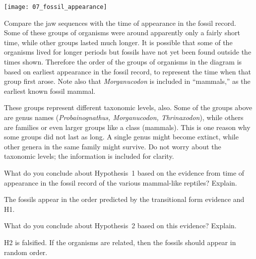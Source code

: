 \documentclass[12pt, hidelinks]{exam}
\newcommand*\AnswerBox[2]{%
    \parbox[t][#1]{0.92\textwidth}{%
    \begin{solution}#2\end{solution}}
    \vspace{\stretch{1}}
}
\begin{document}
\begin{questions}
\begin{center}
\texttt{[image: 07\_fossil\_appearance]}
\end{center}

Compare the jaw sequences with the time of appearance in the
fossil record. Some of these groups of organisms were around apparently
only a fairly short time, while other groups lasted much longer. It is possible
that some of the organisms lived for longer periods but fossils have not yet been
found outside the times shown. Therefore the order of the groups of organisms in the diagram is based on earliest
appearance in the fossil record, to represent the time when that
group first arose. Note also that \textit{Morganucodon} is included
in ``mammals,'' as the earliest known
fossil mammal.

These groups represent different taxonomic levels, also. Some of the
groups above are genus names (\emph{Probainognathus, Morganucodon,
Thrinaxodon}), while others are families or even larger groups like a class 
(mammals). This is one reason why some groups did not last as
long. A single genus might become extinct, while other genera in the
same family might survive. Do not worry about the taxonomic
levels; the information is included for clarity.

\question
What do you conclude about Hypothesis~1 based on the
evidence from time of appearance in the fossil record of the various
mammal-like reptiles? Explain. 

\AnswerBox{2\baselineskip}{%
The fossils appear in the order predicted by the transitional form evidence and H1.
}

\question
What do you conclude about Hypothesis~2 based on this
evidence? Explain.

\AnswerBox{2\baselineskip}{%
H2 is falsified. If the organisms are related, then the fossils should appear in random order.
}



\end{questions}
\end{document}
